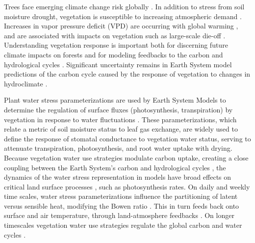 \documentclass[draft,linenumbers]{agujournal}
\begin{document}
Trees face emerging climate change risk globally \citep{allen2010,anderegg2013b}.
In addition to stress from soil moisture drought, vegetation is susceptible to increasing atmospheric demand \citep{restaino2016,novick2016b,lemordant2018}.
Increases in vapor pressure deficit (VPD) are occurring with global warming \citep{ficklin2017,seager2015}, and are associated with impacts on vegetation such as large-scale die-off \citep{williams2013,mcdowell2015}.
Understanding vegetation response is important both for discerning future climate impacts on forests and for modeling feedbacks to the carbon and hydrological cycles \citep{lemordant2018}.
Significant uncertainty remains in Earth System model predictions of the carbon cycle caused by the response of vegetation to changes in hydroclimate \citep{dekauwe2017,friedlingstein2014,trugman2018}.

Plant water stress parameterizations are used by Earth System Models to determine the regulation of surface fluxes (photosynthesis, transpiration) by vegetation in response to water fluctuations \citep{egea2011,verhoef2014}.
These parameterizations, which relate a metric of soil moisture status to leaf gas exchange, are widely used to define the response of stomatal conductance to vegetation water status, serving to attenuate transpiration, photosynthesis, and root water uptake with drying.
Because vegetation water use strategies modulate carbon uptake, creating a close coupling between the Earth System's carbon and hydrological cycles \citep{green2017}, the dynamics of the water stress representation in models have broad effects on critical land surface processes \citep{joetzjer2014}, such as photosynthesis rates.
On daily and weekly time scales, water stress parameterizations influence the partitioning of latent versus sensible heat, modifying the Bowen ratio \citep{gentine2007,gentine2011}. 
This in turn feeds back onto surface and air temperature, through land-atmosphere feedbacks \citep{bonan2008,seneviratne2006}.
On longer timescales vegetation water use strategies regulate the global carbon and water cycles \citep{dekauwe2015}.
\end{document}
